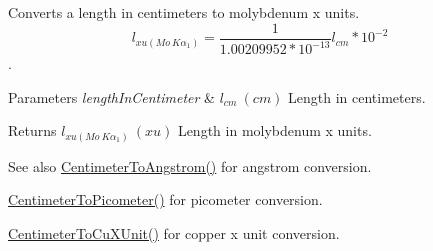 Converts a length in centimeters to molybdenum x units. \[ l_{xu(Mo\ K\alpha_1)}=\frac{1}{1.00209952*10^{-13}} l_{cm} * 10^{-2}\]. 


\begin{DoxyParams}{Parameters}
{\em length\+In\+Centimeter} & $ l_{cm}\ (cm)$ Length in centimeters. \\
\hline
\end{DoxyParams}
\begin{DoxyReturn}{Returns}
$ l_{xu(Mo\ K\alpha_1)}\ (xu)$ Length in molybdenum x units. 
\end{DoxyReturn}
\begin{DoxySeeAlso}{See also}
\mbox{\hyperlink{group___e_g_x_math-_conversions-_length_conversions-_centimeter-_non-_s_i_gacabf2b01cd8676ffb5ec8c70ecd621b6}{Centimeter\+To\+Angstrom()}} for angstrom conversion. 

\mbox{\hyperlink{group___e_g_x_math-_conversions-_length_conversions-_centimeter-_s_i_ga7e2851b0052f1b135a84aa860495e4ba}{Centimeter\+To\+Picometer()}} for picometer conversion. 

\mbox{\hyperlink{group___e_g_x_math-_conversions-_length_conversions-_centimeter-_non-_s_i_ga98d44269c80a1c5ab7c38d27aba39517}{Centimeter\+To\+Cu\+X\+Unit()}} for copper x unit conversion. 
\end{DoxySeeAlso}
